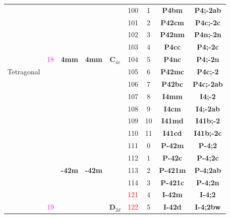 \documentclass{article}      %
\begin{document}
\begin{small}
\begin{longtable}[c]{|c|c|c|c|c|c|c|c|c|}
          & & & & &\textrm{100}  &\textrm{1} &\textbf{P4bm}         &\textbf{P4;-2ab}\\\cline{6-9}      
          & & & & &\textrm{101}  &\textrm{2} &\textbf{P42cm}       &\textbf{P4c;-2c}\\\cline{6-9}       
          & & & & &\textrm{102}  &\textrm{3} &\textbf{P42nm}       &\textbf{P4n;-2n}\\\cline{6-9}       
          & & & & &\textrm{103}  &\textrm{4} &\textbf{P4cc}         &\textbf{P4;-2c}\\\cline{6-9}       
	  & \textrm{\textcolor{magenta}{18}} &\textbf{4mm} &\textbf{4mm} &$\mathbf{C}_{4v}$ &\textrm{104} &\textrm{5} &\textbf{P4nc}  &\textbf{P4;-2n}\\\cline{6-9}
  \textrm{Tetragonal}  & & & & &\textrm{105}  &\textrm{6} &\textbf{P42mc}       &\textbf{P4c;-2}\\\cline{6-9}        
          & & & & &\textrm{106}  &\textrm{7} &\textbf{P42bc}       &\textbf{P4c;-2ab}\\\cline{6-9}      
          & & & & &\textrm{107}  &\textrm{8} &\textbf{I4mm}         &\textbf{I4;-2}\\\cline{6-9}        
          & & & & &\textrm{108}  &\textrm{9} &\textbf{I4cm}         &\textbf{I4;-2ab}\\\cline{6-9}      
          & & & & &\textrm{109}  &\textrm{10} &\textbf{I41md}       &\textbf{I41b;-2}\\\cline{6-9}       
          & & & & &\textrm{110}  &\textrm{11} &\textbf{I41cd}       &\textbf{I41b;-2c}\\\cline{2-9}      
          & & & & &\textrm{111}  &\textrm{0} &\textbf{P-42m}       &\textbf{P-4;2}\\\cline{6-9}         
          & & & & &\textrm{112}  &\textrm{1} &\textbf{P-42c}       &\textbf{P-4;2c}\\\cline{6-9}        
          & & \textbf{-42m} & \textbf{-42m} & &\textrm{113}  &\textrm{2} &\textbf{P-421m}     &\textbf{P-4;2ab}\\\cline{6-9}        
          & & & & &\textrm{114}  &\textrm{3} &\textbf{P-421c}     &\textbf{P-4;2n}\\\cline{6-9}         
	  & & & & &\textrm{\textcolor{red}{121}}&\textrm{4} &\textbf{I-42m} &\textbf{I-4;2} \\\cline{6-9} 
& \textrm{\textcolor{magenta}{19}} & & &$\mathbf{D}_{2d}$ &\textrm{\textcolor{red}{122}}  &\textrm{5} &\textbf{I-42d} &\textbf{I-4;2bw}\\\cline{3-4}\cline{6-9} 

\end{longtable}
\end{small}
\end{document}
